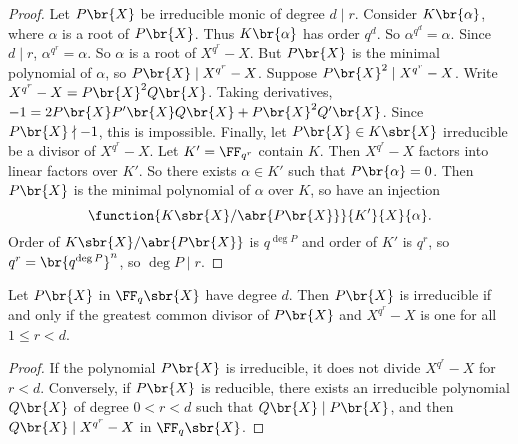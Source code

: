 \begin{proof}
Let $ P\br{X} $ be irreducible monic of degree $ d \mid r $. Consider $ K\br{\alpha} $, where $ \alpha $ is a root of $ P\br{X} $. Thus $ K\br{\alpha} $ has order $ q^d $. So $ \alpha^{q^d} = \alpha $. Since $ d \mid r $, $ \alpha^{q^r} = \alpha $. So $ \alpha $ is a root of $ X^{q^r} - X $. But $ P\br{X} $ is the minimal polynomial of $ \alpha $, so $ P\br{X} \mid X^{q^r} - X $. Suppose $ P\br{X}^2 \mid X^{q^r} - X $. Write $ X^{q^r} - X = P\br{X}^2Q\br{X} $. Taking derivatives, $ -1 = 2P\br{X}P'\br{X}Q\br{X} + P\br{X}^2Q'\br{X} $. Since $ P\br{X} \nmid -1 $, this is impossible. Finally, let $ P\br{X} \in K\sbr{X} $ irreducible be a divisor of $ X^{q^r} - X $. Let $ K' = \FF_{q^r} $ contain $ K $. Then $ X^{q^r} - X $ factors into linear factors over $ K' $. So there exists $ \alpha \in K' $ such that $ P\br{\alpha} = 0 $. Then $ P\br{X} $ is the minimal polynomial of $ \alpha $ over $ K $, so have an injection
$$ \function{K\sbr{X} / \abr{P\br{X}}}{K'}{X}{\alpha}. $$
Order of $ K\sbr{X} / \abr{P\br{X}} $ is $ q^{\deg P} $ and order of $ K' $ is $ q^r $, so $ q^r = \br{q^{\deg P}}^n $, so $ \deg P \mid r $.
\end{proof}

\begin{corollary}
Let $ P\br{X} $ in $ \FF_q\sbr{X} $ have degree $ d $. Then $ P\br{X} $ is irreducible if and only if the greatest common divisor of $ P\br{X} $ and $ X^{q^r} - X $ is one for all $ 1 \le r < d $.
\end{corollary}

\begin{proof}
If the polynomial $ P\br{X} $ is irreducible, it does not divide $ X^{q^r} - X $ for $ r < d $. Conversely, if $ P\br{X} $ is reducible, there exists an irreducible polynomial $ Q\br{X} $ of degree $ 0 < r < d $ such that $ Q\br{X} \mid P\br{X} $, and then $ Q\br{X} \mid X^{q^r} - X $ in $ \FF_q\sbr{X} $.
\end{proof}

